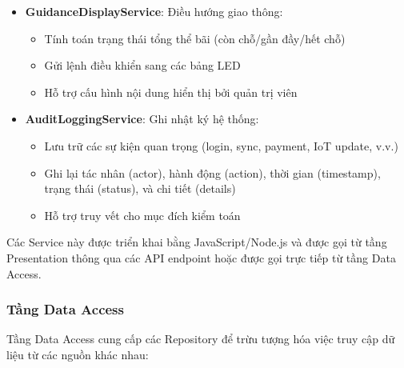 \begin{itemize}
    \item \textbf{GuidanceDisplayService}: Điều hướng giao thông:
    \begin{itemize}
        \item Tính toán trạng thái tổng thể bãi (còn chỗ/gần đầy/hết chỗ)
        \item Gửi lệnh điều khiển sang các bảng LED
        \item Hỗ trợ cấu hình nội dung hiển thị bởi quản trị viên
    \end{itemize}
    
    \item \textbf{AuditLoggingService}: Ghi nhật ký hệ thống:
    \begin{itemize}
        \item Lưu trữ các sự kiện quan trọng (login, sync, payment, IoT update, v.v.)
        \item Ghi lại tác nhân (actor), hành động (action), thời gian (timestamp), trạng thái (status), và chi tiết (details)
        \item Hỗ trợ truy vết cho mục đích kiểm toán
    \end{itemize}
\end{itemize}

Các Service này được triển khai bằng JavaScript/Node.js và được gọi từ tầng Presentation thông qua các API endpoint hoặc được gọi trực tiếp từ tầng Data Access.

\subsubsection{Tầng Data Access}

Tầng Data Access cung cấp các Repository để trừu tượng hóa việc truy cập dữ liệu từ các nguồn khác nhau:

